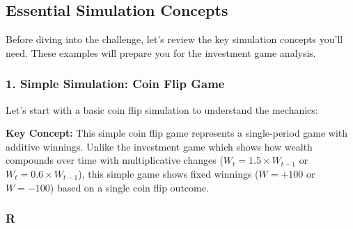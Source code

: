 \documentclass[
  letterpaper,
  DIV=11,
  numbers=noendperiod]{scrartcl}
\newenvironment{Shaded}{\begin{snugshade}}{\end{snugshade}}
\newcommand{\AttributeTok}[1]{\textcolor[rgb]{0.40,0.45,0.13}{#1}}
\newcommand{\CommentTok}[1]{\textcolor[rgb]{0.37,0.37,0.37}{#1}}
\newcommand{\DecValTok}[1]{\textcolor[rgb]{0.68,0.00,0.00}{#1}}
\newcommand{\FloatTok}[1]{\textcolor[rgb]{0.68,0.00,0.00}{#1}}
\newcommand{\FunctionTok}[1]{\textcolor[rgb]{0.28,0.35,0.67}{#1}}
\newcommand{\NormalTok}[1]{\textcolor[rgb]{0.00,0.23,0.31}{#1}}
\newcommand{\OtherTok}[1]{\textcolor[rgb]{0.00,0.23,0.31}{#1}}
\newcommand{\SpecialCharTok}[1]{\textcolor[rgb]{0.37,0.37,0.37}{#1}}
\theoremstyle{definition}
\theoremstyle{remark}
\begin{document}
\subsection{Essential Simulation Concepts
🎯}\label{sec-simulation-concepts}

Before diving into the challenge, let's review the key simulation
concepts you'll need. These examples will prepare you for the investment
game analysis.

\subsubsection{1. Simple Simulation: Coin Flip
Game}\label{simple-simulation-coin-flip-game}

Let's start with a basic coin flip simulation to understand the
mechanics:

\textbf{Key Concept:} This simple coin flip game represents a
single-period game with additive winnings. Unlike the investment game
which shows how wealth compounds over time with multiplicative changes
(\(W_t = 1.5 \times W_{t-1}\) or \(W_t = 0.6 \times W_{t-1}\)), this
simple game shows fixed winnings (\(W = +100\) or \(W = -100\)) based on
a single coin flip outcome.

\subsubsection{R}

\begin{Shaded}
\end{Shaded}
\end{document}
